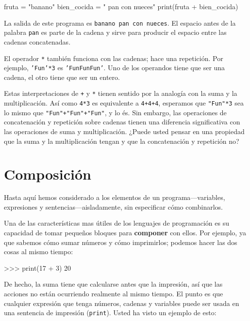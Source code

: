 
\beforeverb
\begin{pythoncode}
fruta = "banano"
bien_cocida = " pan con nueces"
print(fruta + bien_cocida)
\end{pythoncode}
\afterverb
%

La salida de este programa es  \texttt{banano pan con nueces}. El espacio
antes de la palabra \texttt{pan} es parte de la cadena y sirve para
producir el espacio entre las cadenas concatenadas.

El operador \texttt{*} también funciona con las cadenas; hace una repetición.
Por ejemplo, \texttt{'Fun'*3} es \texttt{'FunFunFun'}.  Uno de los operandos tiene que ser una cadena, el otro tiene que ser un entero.

Estas interpretaciones de \texttt{+} y \texttt{*} tienen sentido por la analogía
 con la suma y la  multiplicación.  Así como \texttt{4*3} es
equivalente a \texttt{4+4+4}, esperamos que \texttt{"Fun"*3} sea lo mismo que
{\verb/"Fun"+"Fun"+"Fun"/}, y lo és.  Sin embargo, las operaciones de concatenación y repetición 
sobre cadenas tienen una diferencia
significativa con las operaciones de suma y multiplicación.
¿Puede usted pensar en una propiedad que la suma y la multiplicación tengan
y que la concatenación y repetición no?

\section{Composición}

Hasta aquí hemos considerado a los elementos de un programa---variables,
expresiones y sentencias---aisladamente, sin especificar cómo combinarlos.

Una de las características mas útiles de los lenguajes de programación es
su capacidad de tomar pequeños bloques para  {\bf componer} con ellos.  Por
ejemplo, ya que sabemos cómo sumar números y cómo imprimirlos; podemos hacer
las dos cosas al mismo tiempo:

\beforeverb
\begin{pyconcode}
>>>  print(17 + 3)
20
\end{pyconcode}
\afterverb
%

De hecho, la suma tiene que calcularse antes que la impresión, así que las
acciones no están ocurriendo realmente al mismo tiempo. El punto es que  
cualquier expresión que tenga números, cadenas y variables puede ser usada
en una sentencia de impresión (\texttt{print}).  Usted ha visto un ejemplo 
de esto:

